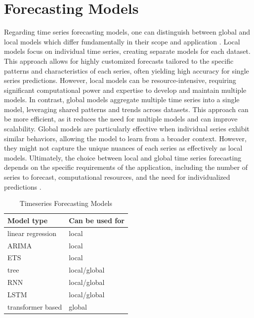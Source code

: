 \section{Forecasting Models}
\label{sec:forecasting_models}
Regarding time series forecasting models, one can distinguish between global and local models which differ fundamentally in their scope and application \parencite{montero2021principles}. Local models focus on individual time series, creating separate models for each dataset. This approach allows for highly customized forecasts tailored to the specific patterns and characteristics of each series, often yielding high accuracy for single series predictions. However, local models can be resource-intensive, requiring significant computational power and expertise to develop and maintain multiple models. In contrast, global models aggregate multiple time series into a single model, leveraging shared patterns and trends across datasets. This approach can be more efficient, as it reduces the need for multiple models and can improve scalability. Global models are particularly effective when individual series exhibit similar behaviors, allowing the model to learn from a broader context. However, they might not capture the unique nuances of each series as effectively as local models. Ultimately, the choice between local and global time series forecasting depends on the specific requirements of the application, including the number of series to forecast, computational resources, and the need for individualized predictions \parencite{montero2021principles}.

\begin{table}[h]
\centering
\begin{tabular}{ll}
\toprule
\textbf{Model type} & \textbf{Can be used for} \\
\midrule
linear regression & local \\
\midrule
ARIMA & local\\
\midrule
ETS & local\\
\midrule 
tree  & local/global \\
\midrule
RNN & local/global \\
\midrule
LSTM & local/global \\
\midrule
transformer based & global \\

\bottomrule
\end{tabular}
\caption{Timeseries Forecasting Models}
\label{tab:timeseries_models}
\end{table}

